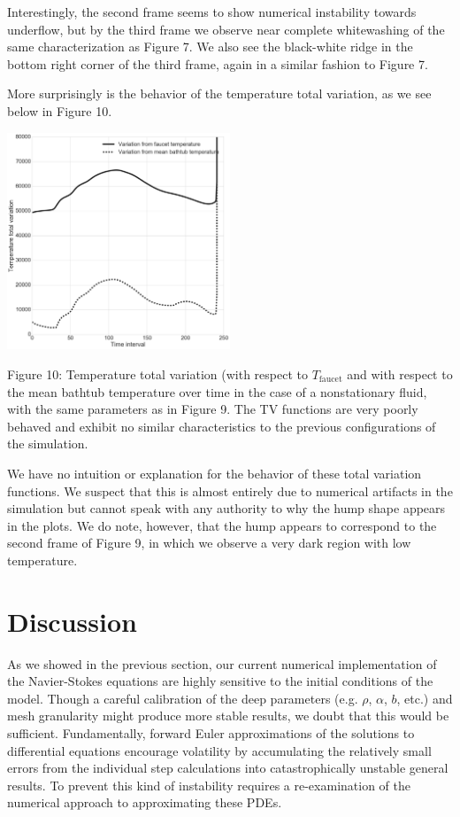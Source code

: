 \documentclass[12pt]{amsart}
\begin{document}
Interestingly, the second frame seems to show numerical instability towards
underflow, but by the third frame we observe near complete whitewashing of the
same characterization as Figure 7. We also see the black-white ridge in the
bottom right corner of the third frame, again in a similar fashion to Figure 7.

More surprisingly is the behavior of the temperature total variation, as we see
below in Figure 10.
\begin{center}
    \includegraphics[width=0.5\textwidth]{../plots/tv-05.png}

    \justify
    \footnotesize{
        Figure 10: Temperature total variation (with respect to
        $T_{\mathrm{faucet}}$ and with respect to the mean bathtub temperature
        over time in the case of a nonstationary fluid, with the same parameters
        as in Figure 9. The TV functions are very poorly behaved and exhibit no
        similar characteristics to the previous configurations of the
        simulation.}
\end{center}
We have no intuition or explanation for the behavior of these total variation
functions. We suspect that this is almost entirely due to numerical artifacts in
the simulation but cannot speak with any authority to why the hump shape appears
in the plots. We do note, however, that the hump appears to correspond to the
second frame of Figure 9, in which we observe a very dark region with low
temperature. 




\section{Discussion}

As we showed in the previous section, our current numerical implementation of
the Navier-Stokes equations are highly sensitive to the initial conditions of
the model. Though a careful calibration of the deep parameters (e.g. $\rho$,
$\alpha$, $b$, etc.) and mesh granularity might produce more stable results,
we doubt that this would be sufficient. Fundamentally, forward Euler
approximations of the solutions to differential equations encourage volatility 
by accumulating the relatively small errors from the individual step
calculations into catastrophically unstable general results. To prevent this
kind of instability requires a re-examination of the numerical approach to
approximating these PDEs.
\end{document}
